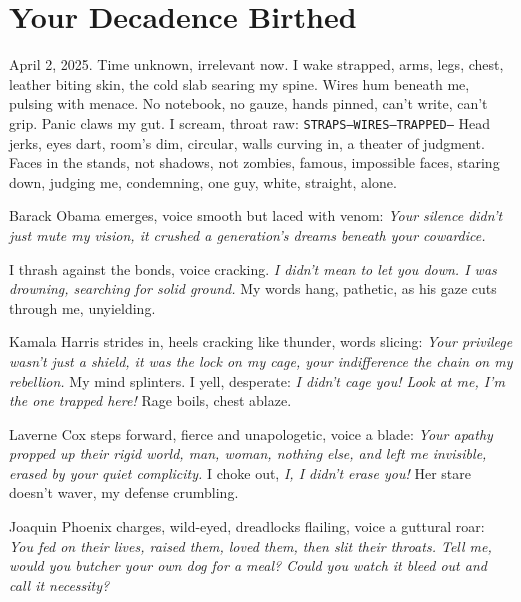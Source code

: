 \documentclass[12pt,oneside]{book}
\newcommand{\note}[1]{\texttt{#1}}
\begin{document}
\chapter{Your Decadence Birthed}

April 2, 2025. Time unknown, irrelevant now. I wake strapped, arms, legs, chest, leather biting skin, the cold slab searing my spine. Wires hum beneath me, pulsing with menace. No notebook, no gauze, hands pinned, can’t write, can’t grip. Panic claws my gut. I scream, throat raw: \note{STRAPS—WIRES—TRAPPED—} Head jerks, eyes dart, room’s dim, circular, walls curving in, a theater of judgment. Faces in the stands, not shadows, not zombies, famous, impossible faces, staring down, judging me, condemning, one guy, white, straight, alone.

Barack Obama emerges, voice smooth but laced with venom: \textit{Your silence didn’t just mute my vision, it crushed a generation’s dreams beneath your cowardice.}

I thrash against the bonds, voice cracking. \textit{I didn’t mean to let you down. I was drowning, searching for solid ground.} My words hang, pathetic, as his gaze cuts through me, unyielding.

Kamala Harris strides in, heels cracking like thunder, words slicing: \textit{Your privilege wasn’t just a shield, it was the lock on my cage, your indifference the chain on my rebellion.} My mind splinters. I yell, desperate: \textit{I didn’t cage you! Look at me, I’m the one trapped here!} Rage boils, chest ablaze.

Laverne Cox steps forward, fierce and unapologetic, voice a blade: \textit{Your apathy propped up their rigid world, man, woman, nothing else, and left me invisible, erased by your quiet complicity.} I choke out, \textit{I, I didn’t erase you!} Her stare doesn’t waver, my defense crumbling.

Joaquin Phoenix charges, wild-eyed, dreadlocks flailing, voice a guttural roar: \textit{You fed on their lives, raised them, loved them, then slit their throats. Tell me, would you butcher your own dog for a meal? Could you watch it bleed out and call it necessity?}
\end{document}
